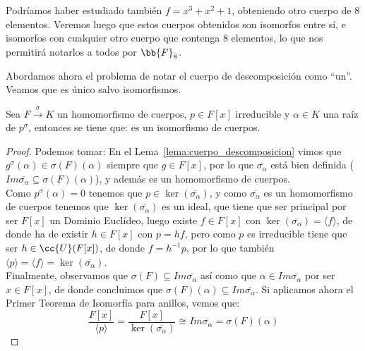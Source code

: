 \begin{ejemplo}
    \noindent
    Podríamos haber estudiado también $f=x^3+x^2+1$, obteniendo otro cuerpo de $8$ elementos. Veremos luego que estos cuerpos obtenidos son isomorfos entre sí, e isomorfos con cualquier otro cuerpo que contenga $8$ elementos, lo que nos permitirá notarlos a todos por $\bb{F}_8$.
\end{ejemplo}

Abordamos ahora el problema de notar el cuerpo de descomposición como ``un''. Veamos que es único salvo isomorfismos.
\begin{lema}\label{lema:extension}
    Sea $F\stackrel{\sigma}{\to}{K}$ un homomorfismo de cuerpos, $p\in F[x]$ irreducible y $\alpha\in K$ una raíz de $p^\sigma$, entonces se tiene que:
    es un isomorfismo de cuerpos.
    \begin{proof}
        Podemos tomar:
        En el Lema~\ref{lema:cuerpo_descomposicion} vimos que $g^{\sigma}(\alpha)\in \sigma(F)(\alpha)$ siempre que $g\in F[x]$, por lo que $\overline{\sigma_\alpha}$ está bien definida ($Im \overline{\sigma_\alpha}\subseteq  \sigma(F)(\alpha)$), y además es un homomorfismo de cuerpos.\\

        \noindent
        Como $p^\sigma(\alpha) = 0$ tenemos que $p\in \ker(\overline{\sigma_\alpha})$, y como $\overline{\sigma_\alpha}$ es un homomorfismo de cuerpos tenemos que $\ker(\overline{\sigma_\alpha})$ es un ideal, que tiene que ser principal por ser $F[x]$ un Dominio Euclídeo, luego existe $f\in F[x]$ con $\ker(\overline{\sigma_\alpha}) = \langle f \rangle $, de donde ha de existir $h\in F[x]$ con $p = hf$, pero como $p$ es irreducible tiene que ser $h\in \cc{U}(F[x])$, de donde $f = h^{-1}p$, por lo que también $\langle p \rangle = \langle f \rangle =\ker(\overline{\sigma_\alpha})$.\\

        \noindent
        Finalmente, observamos que $\sigma(F)\subseteq Im\overline{\sigma_\alpha}$ así como que $\alpha\in Im\overline{\sigma_\alpha}$ por ser $x\in F[x]$, de donde concluimos que $\sigma(F)(\alpha)\subseteq Im\overline{\sigma_\alpha}$. Si aplicamos ahora el Primer Teorema de Isomorfía para anillos, vemos que:
        \begin{equation*}
            \dfrac{F[x]}{\langle p \rangle } = \dfrac{F[x]}{\ker(\overline{\sigma_\alpha})} \cong Im \overline{\sigma_\alpha} = \sigma(F)(\alpha)
        \end{equation*}
    \end{proof}
\end{lema}

